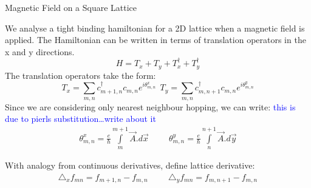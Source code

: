 \documentclass[12pt, oneside, listof=totoc,dvipsnames]{scrbook}
\begin{document}
	\begin{chapter}{Magnetic Field on a Square Lattice}
		
		We analyse a tight binding hamiltonian for a 2D lattice when a magnetic field is applied. The Hamiltonian can be written in terms of translation operators in the x and y directions. 
		\[H= T_x+T_y+T^\dagger_x+T^\dagger_y\]
		\noindent
		The translation operators take the form:
		\[T_x = \sum \limits_{m,n} c^\dagger_{m+1,n}c_{m,n}e^{i\theta^x_{m,n}} \ \ T_y = \sum \limits_{m,n} c^\dagger_{m,n+1}c_{m,n}e^{i\theta^y_{m,n}}\]
		\noindent
		Since we are considering only nearest neighbour hopping, we can write: \textcolor{blue}{this is due to pierls substitution\ldots write about it}
		\begin{align*}
			\theta^x_{m,n} = \frac{e}{\hbar}\int \limits_m^{m+1} \Vec{A}. d\Vec{x}\hspace{1cm}
			\theta^y_{m,n} = \frac{e}{\hbar}\int \limits_n^{n+1} \Vec{A}. d\Vec{y}
		\end{align*}
		
		With analogy from continuous derivatives, define lattice derivative: 
		\begin{align*}
			\triangle_x f_{mn} = f_{m+1,n}-f_{m,n}\hspace{1cm}
			\triangle_y f_{mn} = f_{m,n+1}-f_{m,n}
		\end{align*}
		
		
		
		
		\begin{center}
			
			
			
			
			
			\begin{tikzpicture}[x=0.75pt,y=0.75pt,yscale=-1,xscale=1]
				

\end{tikzpicture}
\end{center}
\end{chapter}
\end{document}
